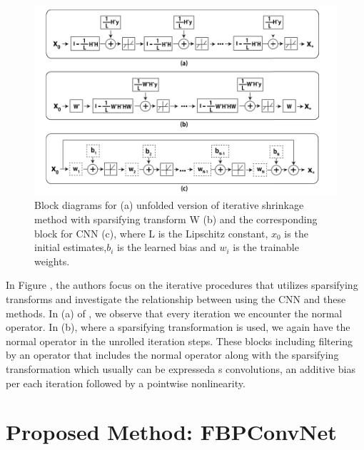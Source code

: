 \documentclass[journal, onecolumn, 11pt]{IEEEtran}
\begin{document}
\begin{figure}[h]
\centering
\includegraphics[width=\textwidth]{images/ISTA_block.png}
\caption{Block diagrams \cite{FBPConvNet} for (a) unfolded version \cite{ISTAnew} of iterative shrinkage method \cite{ISTA} with sparsifying transform W (b) and the corresponding block for CNN (c), where L is the Lipschitz constant, $x_0$ is the initial estimates,$b_i$ is the learned bias and $w_i$ is the trainable weights.}\label{fig:blocks}
\end{figure}

In Figure , the authors focus on the iterative procedures that utilizes sparsifying transforms and investigate the relationship between using the CNN and these methods. In (a) of , we observe that every iteration we encounter the normal operator. In (b), where a sparsifying transformation is used, we again have the normal operator in the unrolled iteration steps. These blocks including filtering by an operator that includes the normal operator along with the sparsifying transformation which usually can be expresseda s convolutions, an additive bias per each iteration followed by a pointwise nonlinearity.  

\vfill\null\newpage
\section{Proposed Method: FBPConvNet}
\end{document}
